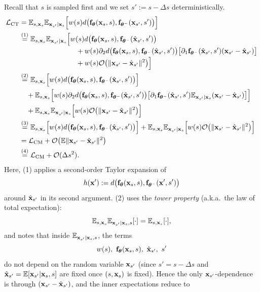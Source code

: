 Recall that $s$ is sampled first and we set $s':=s-\Delta s$ deterministically.
\begin{align*}
\mathcal{L}_{\mathrm{CT}}
&= \mathbb{E}_{s,{\mathbf{x}}_s}\mathbb{E}_{{\mathbf{x}}_{s'}|{\mathbf{x}}_s} \Big[w(s) d\big({\mathbf{f}}_{{\bm{\theta}}}({\mathbf{x}}_s,s), {\mathbf{f}}_{{\bm{\theta}}^-}({\mathbf{x}}_{s'},s')\big)\Big]
\\
&\overset{\text{(1)}}{=} \mathbb{E}_{s,{\mathbf{x}}_s}\mathbb{E}_{{\mathbf{x}}_{s'}|{\mathbf{x}}_s} \Big[
w(s) d\big({\mathbf{f}}_{{\bm{\theta}}}({\mathbf{x}}_s,s), {\mathbf{f}}_{{\bm{\theta}}^-}(\hat{{\mathbf{x}}}_{s'},s')\big)
\\[-2pt]
&\qquad\qquad\qquad\qquad
+ w(s) \partial_2 d\big({\mathbf{f}}_{{\bm{\theta}}}({\mathbf{x}}_s,s),{\mathbf{f}}_{{\bm{\theta}}^-}(\hat{{\mathbf{x}}}_{s'},s')\big)\big[\partial_1{\mathbf{f}}_{{\bm{\theta}}^-}(\hat{{\mathbf{x}}}_{s'},s')({\mathbf{x}}_{s'}-\hat{{\mathbf{x}}}_{s'})\big]
\\[-2pt]
&\qquad\qquad\qquad\qquad
+ w(s) \mathcal O \big(\|{\mathbf{x}}_{s'}-\hat{{\mathbf{x}}}_{s'}\|^2\big)\Big]
\\
&\overset{\text{(2)}}{=} \mathbb{E}_{s,{\mathbf{x}}_s} \Big[w(s) d\big({\mathbf{f}}_{{\bm{\theta}}}({\mathbf{x}}_s,s), {\mathbf{f}}_{{\bm{\theta}}^-}(\hat{{\mathbf{x}}}_{s'},s')\big)\Big]
\\
&\quad+ \mathbb{E}_{s,{\mathbf{x}}_s} \Big[w(s) \partial_2 d\big({\mathbf{f}}_{{\bm{\theta}}}({\mathbf{x}}_s,s),{\mathbf{f}}_{{\bm{\theta}}^-}(\hat{{\mathbf{x}}}_{s'},s')\big)\big[\partial_1{\mathbf{f}}_{{\bm{\theta}}^-}(\hat{{\mathbf{x}}}_{s'},s') \mathbb{E}_{{\mathbf{x}}_{s'}|{\mathbf{x}}_s}({\mathbf{x}}_{s'}-\hat{{\mathbf{x}}}_{s'})\big]\Big]
\\
&\quad+ \mathbb{E}_{s,{\mathbf{x}}_s}\mathbb{E}_{{\mathbf{x}}_{s'}|{\mathbf{x}}_s} \Big[w(s) \mathcal{O} \big(\|{\mathbf{x}}_{s'}-\hat{{\mathbf{x}}}_{s'}\|^2\big)\Big]
\\
&\overset{\text{(3)}}{=} \mathbb{E}_{s,{\mathbf{x}}_s} \Big[w(s) d\big({\mathbf{f}}_{{\bm{\theta}}}({\mathbf{x}}_s,s), {\mathbf{f}}_{{\bm{\theta}}^-}(\hat{{\mathbf{x}}}_{s'},s')\big)\Big]
+ \mathbb{E}_{s,{\mathbf{x}}_s}\mathbb{E}_{{\mathbf{x}}_{s'}|{\mathbf{x}}_s} \Big[w(s) \mathcal{O} \big(\|{\mathbf{x}}_{s'}-\hat{{\mathbf{x}}}_{s'}\|^2\big)\Big]
\\
&= \mathcal{L}_{\mathrm{CM}} 
+ \mathcal{O} \big(\mathbb{E}\|{\mathbf{x}}_{s'}-\hat{{\mathbf{x}}}_{s'}\|^2\big)
\\
&\overset{\text{(4)}}{=} \mathcal{L}_{\mathrm{CM}} + \mathcal{O}(\Delta s^2).
\end{align*}
Here, (1) applies a second-order Taylor expansion of 
\[
h({\mathbf{x}}') := d\big({\mathbf{f}}_{{\bm{\theta}}}({\mathbf{x}}_s,s), {\mathbf{f}}_{{\bm{\theta}}^-}({\mathbf{x}}',s')\big)
\]
around $\hat{{\mathbf{x}}}_{s'}$ in its second argument. (2) uses the \textit{tower property} (a.k.a.\ the law of total expectation):
\[
\mathbb{E}_{s,{\mathbf{x}}_s}\mathbb{E}_{{\mathbf{x}}_{s'}|{\mathbf{x}}_s,s}[\cdot]
=\mathbb{E}_{s,{\mathbf{x}}_s}[\cdot],
\]
and notes that inside $\mathbb{E}_{{\mathbf{x}}_{s'}|{\mathbf{x}}_s,s}$, the terms
\[
w(s),\ \rvf_{\btheta}(\rvx_s,s),\ \hat\rvx_{s'},\ s'
\]
do not depend on the random variable ${\mathbf{x}}_{s'}$ (since $s' = s-\Delta s$ and $\hat{{\mathbf{x}}}_{s'}=\mathbb{E}[{\mathbf{x}}_{s'}|{\mathbf{x}}_s,s]$ are fixed once $(s,{\mathbf{x}}_s)$ is fixed). Hence the only ${\mathbf{x}}_{s'}$-dependence is through $({\mathbf{x}}_{s'}-\hat{{\mathbf{x}}}_{s'})$, and the inner expectations reduce to
